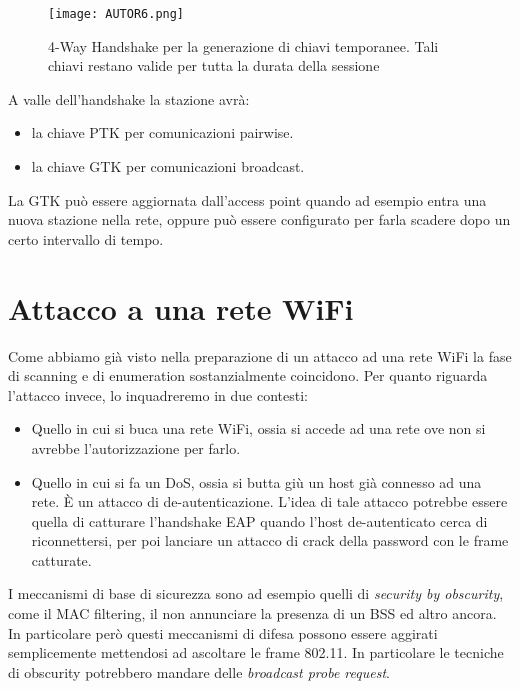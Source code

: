 \documentclass[14pt]{extreport}
\begin{document}
\begin{figure}[H]
    \centering
    \texttt{[image: AUTOR6.png]}
    \caption{4-Way Handshake per la generazione di chiavi temporanee. Tali chiavi restano valide per tutta la durata della sessione}
    \label{AUTOR6}
\end{figure}


A valle dell'handshake la stazione avrà:

\begin{itemize}
    \item la chiave PTK per comunicazioni pairwise.
    
    \item la chiave GTK per comunicazioni broadcast.
\end{itemize}




La GTK può essere aggiornata dall'access point quando ad esempio entra una nuova stazione nella rete, oppure può essere configurato per farla scadere dopo un certo intervallo di tempo.





\section{Attacco a una rete WiFi}

Come abbiamo già visto nella preparazione di un attacco ad una rete WiFi la fase di scanning e di enumeration sostanzialmente coincidono. Per quanto riguarda l'attacco invece, lo inquadreremo in due contesti:

\begin{itemize}
    \item Quello in cui si buca una rete WiFi, ossia si accede ad una rete ove non si avrebbe l'autorizzazione per farlo.
    
    \item Quello in cui si fa un DoS, ossia si butta giù un host già connesso ad una rete. È un attacco di de-autenticazione. L'idea di tale attacco potrebbe essere quella di catturare l'handshake EAP quando l'host de-autenticato cerca di riconnettersi, per poi lanciare un attacco di crack della password con le frame catturate.
\end{itemize}


I meccanismi di base di sicurezza sono ad esempio quelli di \textit{security by obscurity}, come il MAC filtering, il non annunciare la presenza di un BSS ed altro ancora. In particolare però questi meccanismi di difesa possono essere aggirati semplicemente mettendosi ad ascoltare le frame 802.11. In particolare le tecniche di obscurity potrebbero mandare delle \textit{broadcast probe request}.
\end{document}

